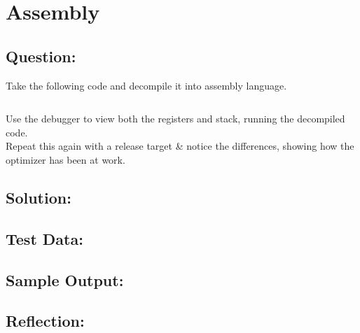 \documentclass[Lab-B.tex]{subfiles}
\begin{document}
    \section{Assembly}
        \subsection*{Question:}
            Take the following code and decompile it into assembly language.

            \inputminted{cpp}{../03-Assembly/Assembly.cpp}

            Use the debugger to view both the registers and stack, 
            running the decompiled code.\\

            Repeat this again with a release target \& notice the differences,
            showing how the optimizer has been at work.

        \subsection*{Solution:}

        \subsection*{Test Data:}
        
        \subsection*{Sample Output:}

        \subsection*{Reflection:}
\end{document}
